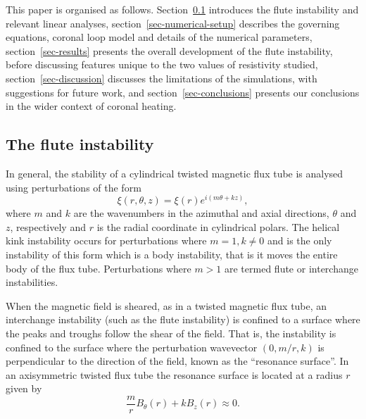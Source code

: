 \documentclass[fleqn,usenatbib]{mnras}
\newcommand{\rs}[2]{{#2}}
\begin{document}
This paper is organised as follows. Section~\ref{sec-flute-intro} introduces the flute instability and relevant linear analyses, section~\ref{sec-numerical-setup} describes the governing equations, coronal loop model and details of the numerical parameters, section~\ref{sec-results} presents the overall development of the flute instability, before discussing features unique to the two values of resistivity studied, section~\ref{sec-discussion} discusses the limitations of the simulations, with suggestions for future work, and section~\ref{sec-conclusions} presents our conclusions in the wider context of coronal heating.

\subsection{The \rs{fluting}{flute} instability}
\label{sec-flute-intro}

In general, the stability of a cylindrical twisted magnetic flux tube is analysed using perturbations of the form
\begin{equation}
  \label{eq:kink_perturbation}
\xi(r, \theta, z) = \xi(r) e^{i(m\theta + kz)},
\end{equation}
where $m$ and $k$ are the wavenumbers \rs{in the $\theta$ and $z$
  directions, respectively}{in the azimuthal and axial directions,
  $\theta$ and $z$, respectively and $r$ is the radial coordinate in
  cylindrical polars}. 
The helical kink instability occurs for perturbations where $m=1, k\ne0$ and is the only instability of this form which is a body instability, that is it moves the entire body of the flux tube. Perturbations where $m>1$ are termed \rs{fluting}{flute} or interchange instabilities.

When the magnetic field is sheared, as in a twisted magnetic flux
tube, an interchange instability (such as the \rs{fluting}{flute}
instability) is confined to a surface where the peaks and troughs
follow the shear of the field. That is, the instability is confined to
the surface where the perturbation wavevector $(0, m/r, k)$ is
perpendicular to the direction of the field, \rs{}{known as the
  ``resonance surface''}. \rs{which in}{In} an axisymmetric twisted
flux tube \rs{}{the resonance surface} is located at a radius $r$
given by
\begin{equation}
  \label{eq:resonant_surface}
\frac{m}{r} B_{\theta}(r) + kB_z(r) \approx 0.
\end{equation}
\end{document}

